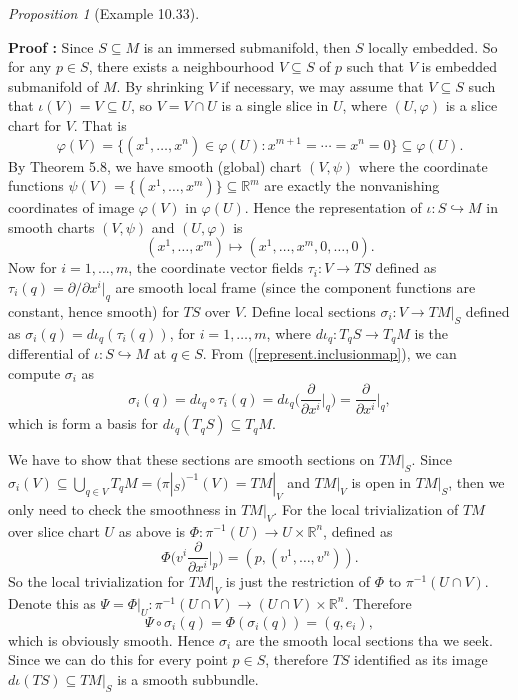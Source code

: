\documentclass[a4paper]{article}
\theoremstyle{remark}
\newtheorem{prop}{Proposition}
\newcommand{\rn}{\mathbb{R}^n} %
\newcommand{\doo}{\partial}    %
\newcommand{\subhim}{\subseteq} %
\newcommand{\ddxip}{\frac{\partial}{\partial x^i}\bigg|_p} %
\newcommand{\ddxi}{\frac{\partial}{\partial x^i}} %
\begin{document}
\begin{prop}[Example 10.33]
\begin{enumerate}
\textbf{Proof : } Since $S \subhim M$ is an immersed submanifold, then $S$ locally embedded. So for any $p \in S$, there exists a neighbourhood $V \subhim S$ of $p$ such that $V$ is embedded submanifold of $M$. By shrinking $V$ if necessary, we may assume that $V \subhim S$ such that $\iota(V)=V \subhim U$, so $V = V \cap U$ is a single slice in $U$, where $(U,\varphi)$ is a slice chart for $V$. That is 
$$
\varphi(V) = \{(x^1,\dots,x^n) \in \varphi(U) : x^{m+1} = \cdots= x^n = 0   \} \subhim \varphi(U).
$$
By Theorem 5.8, we have smooth (global) chart $(V,\psi)$ where the coordinate functions $\psi (V) = \{ (x^1,\dots,x^m)\} \subhim \mathbb{R}^m$ are exactly the nonvanishing coordinates of image $\varphi(V)$ in $\varphi(U)$. Hence the representation of $\iota : S \hookrightarrow M$ in smooth charts $(V,\psi)$ and $(U,\varphi)$ is
\begin{equation}\label{represent.inclusionmap}\tag{$\star$}
(x^1,\dots,x^m) \mapsto (x^1,\dots,x^m,0,\dots,0).
\end{equation}
Now for $i=1,\dots,m$, the coordinate vector fields $\tau_i : V \to TS$ defined as $\tau_i(q) = \doo / \doo x^i\big|_q$ are smooth local frame (since the component functions are constant, hence smooth) for $TS$ over $V$. Define local sections $\sigma_i : V \to TM|_S$ defined as $\sigma_i(q) = d\iota_q (\tau_i(q))$, for $i =1,\dots,m$, where $d\iota_q : T_qS \to T_qM$ is the differential of $\iota : S \hookrightarrow M$ at $q\in S$. From (\ref{represent.inclusionmap}), we can compute $\sigma_i$ as
$$
\sigma_i(q) = d\iota_q \circ \tau_i(q) = d\iota_q \Big(\ddxi\bigg|_q \Big) = \ddxi\bigg|_q,
$$
which is form a basis for $d\iota_q(T_qS) \subhim T_qM$. 

We have to show that these sections are smooth sections on $TM|_S$. Since $\sigma_i (V) \subhim \bigcup_{q \in V} T_qM = (\pi|_S)^{-1}(V) = TM|_V$ and $TM|_V$ is open in $TM|_S$, then we only need to check the smoothness in $TM|_V$. For the local trivialization of $TM$ over slice chart $U$ as above is $\Phi : \pi^{-1}(U) \to U \times \rn$, defined as
$$
\Phi \Big(v^i \ddxip \Big) = (p,(v^1,\dots,v^n)).
$$
So the local trivialization for $TM|_V$ is just the restriction of $\Phi$ to $\pi^{-1}(U \cap V)$. Denote this as  $\Psi = \Phi|_U : \pi^{-1}(U \cap V) \to (U \cap V) \times \rn$. Therefore 
$$
\Psi \circ \sigma_i (q) =\Phi(\sigma_i(q)) =(q,e_i),
$$
which is obviously smooth. Hence $\sigma_i$ are the smooth local sections tha we seek. Since we can do this for every point $p \in S$, therefore $TS$ identified as its image $d\iota(TS) \subhim TM|_S$ is a smooth subbundle.
\end{enumerate}
\end{prop}
\end{document}
